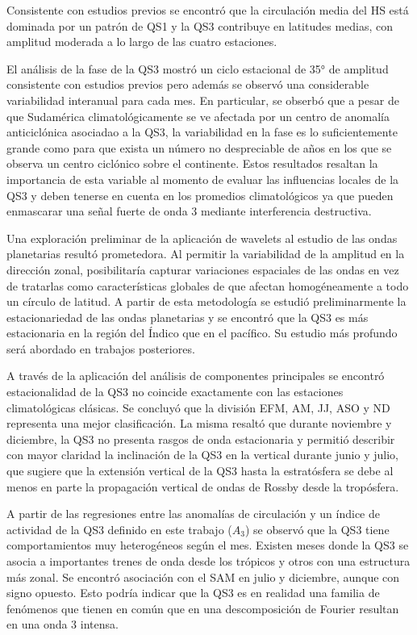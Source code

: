 \documentclass[spanish,a4paper,12pt,oneside]{book}
\begin{document}
Consistente con estudios previos se encontró que la circulación media
del HS está dominada por un patrón de QS1 y la QS3 contribuye en
latitudes medias, con amplitud moderada a lo largo de las cuatro
estaciones.

El análisis de la fase de la QS3 mostró un ciclo estacional de 35° de
amplitud consistente con estudios previos pero además se observó una
considerable variabilidad interanual para cada mes. En particular, se
obserbó que a pesar de que Sudamérica climatológicamente se ve afectada
por un centro de anomalía anticiclónica asociadao a la QS3, la
variabilidad en la fase es lo suficientemente grande como para que
exista un número no despreciable de años en los que se observa un centro
ciclónico sobre el continente. Estos resultados resaltan la importancia
de esta variable al momento de evaluar las influencias locales de la QS3
y deben tenerse en cuenta en los promedios climatológicos ya que pueden
enmascarar una señal fuerte de onda 3 mediante interferencia
destructiva.

Una exploración preliminar de la aplicación de wavelets al estudio de
las ondas planetarias resultó prometedora. Al permitir la variabilidad
de la amplitud en la dirección zonal, posibilitaría capturar variaciones
espaciales de las ondas en vez de tratarlas como características
globales de que afectan homogéneamente a todo un círculo de latitud. A
partir de esta metodología se estudió preliminarmente la estacionariedad
de las ondas planetarias y se encontró que la QS3 es más estacionaria en
la región del Índico que en el pacífico. Su estudio más profundo será
abordado en trabajos posteriores.

A través de la aplicación del análisis de componentes principales se
encontró estacionalidad de la QS3 no coincide exactamente con las
estaciones climatológicas clásicas. Se concluyó que la división EFM, AM,
JJ, ASO y ND representa una mejor clasificación. La misma resaltó que
durante noviembre y diciembre, la QS3 no presenta rasgos de onda
estacionaria y permitió describir con mayor claridad la inclinación de
la QS3 en la vertical durante junio y julio, que sugiere que la
extensión vertical de la QS3 hasta la estratósfera se debe al menos en
parte la propagación vertical de ondas de Rossby desde la tropósfera.

A partir de las regresiones entre las anomalías de circulación y un
índice de actividad de la QS3 definido en este trabajo (\(A_3\)) se
observó que la QS3 tiene comportamientos muy heterogéneos según el mes.
Existen meses donde la QS3 se asocia a importantes trenes de onda desde
los trópicos y otros con una estructura más zonal. Se encontró
asociación con el SAM en julio y diciembre, aunque con signo opuesto.
Esto podría indicar que la QS3 es en realidad una familia de fenómenos
que tienen en común que en una descomposición de Fourier resultan en una
onda 3 intensa.
\end{document}
